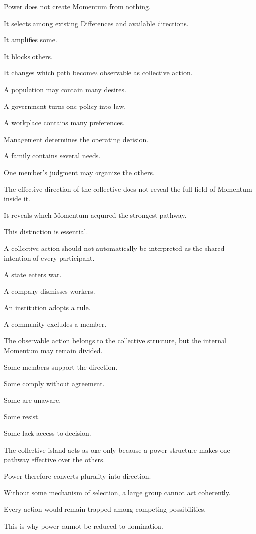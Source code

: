 Power does not create Momentum from nothing.

It selects among existing Differences and available directions.

It amplifies some.

It blocks others.

It changes which path becomes observable as collective action.

A population may contain many desires.

A government turns one policy into law.

A workplace contains many preferences.

Management determines the operating decision.

A family contains several needs.

One member’s judgment may organize the others.

The effective direction of the collective does not reveal the full field of Momentum inside it.

It reveals which Momentum acquired the strongest pathway.

This distinction is essential.

A collective action should not automatically be interpreted as the shared intention of every participant.

A state enters war.

A company dismisses workers.

An institution adopts a rule.

A community excludes a member.

The observable action belongs to the collective structure, but the internal Momentum may remain divided.

Some members support the direction.

Some comply without agreement.

Some are unaware.

Some resist.

Some lack access to decision.

The collective island acts as one only because a power structure makes one pathway effective over the others.

Power therefore converts plurality into direction.

Without some mechanism of selection, a large group cannot act coherently.

Every action would remain trapped among competing possibilities.

This is why power cannot be reduced to domination.

